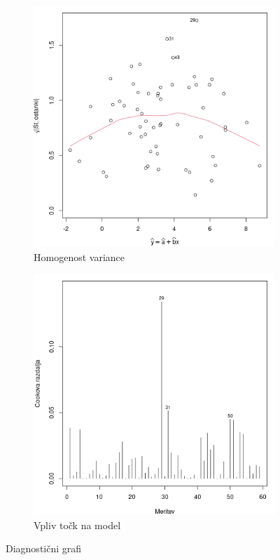 \begin{figure}[!h]
    \begin{subfigure}[ht]{0.49\textwidth}
        \includegraphics[width=\textwidth]{res/homogenost-variance.png}
        \caption{Homogenost variance}
        \label{img:homogenost-variance}
    \end{subfigure}
    \hfill
    \begin{subfigure}[ht]{0.49\textwidth}
        \includegraphics[width=\textwidth]{res/vpliv-tock-na-model.png}
        \caption{Vpliv točk na model}
        \label{img:vpliv-tock-na-model}
    \end{subfigure}
    \caption{Diagnostični grafi}
    \label{img:diagnosticni-grafi}
\end{figure}

